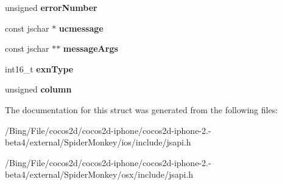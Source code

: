 \begin{DoxyCompactItemize}
\item 
\hypertarget{struct_j_s_error_report_a8f97e410e6f4fcb5b0b719ffd6907c44}{unsigned {\bfseries error\-Number}}\label{struct_j_s_error_report_a8f97e410e6f4fcb5b0b719ffd6907c44}

\item 
\hypertarget{struct_j_s_error_report_abe2899cca2e4fef4c6c1dbee3a917611}{const jschar $\ast$ {\bfseries ucmessage}}\label{struct_j_s_error_report_abe2899cca2e4fef4c6c1dbee3a917611}

\item 
\hypertarget{struct_j_s_error_report_ae285c9f2cd28c0fcec60b71c53ad9cee}{const jschar $\ast$$\ast$ {\bfseries message\-Args}}\label{struct_j_s_error_report_ae285c9f2cd28c0fcec60b71c53ad9cee}

\item 
\hypertarget{struct_j_s_error_report_ac13b8c317c12b631aa80b9cf24e81ca2}{int16\-\_\-t {\bfseries exn\-Type}}\label{struct_j_s_error_report_ac13b8c317c12b631aa80b9cf24e81ca2}

\item 
\hypertarget{struct_j_s_error_report_a919486486431825faacc51c6dd18c9a3}{unsigned {\bfseries column}}\label{struct_j_s_error_report_a919486486431825faacc51c6dd18c9a3}

\end{DoxyCompactItemize}


The documentation for this struct was generated from the following files\-:\begin{DoxyCompactItemize}
\item 
/\-Bing/\-File/cocos2d/cocos2d-\/iphone/cocos2d-\/iphone-\/2.-\/beta4/external/\-Spider\-Monkey/ios/include/jsapi.\-h\item 
/\-Bing/\-File/cocos2d/cocos2d-\/iphone/cocos2d-\/iphone-\/2.-\/beta4/external/\-Spider\-Monkey/osx/include/jsapi.\-h\end{DoxyCompactItemize}
